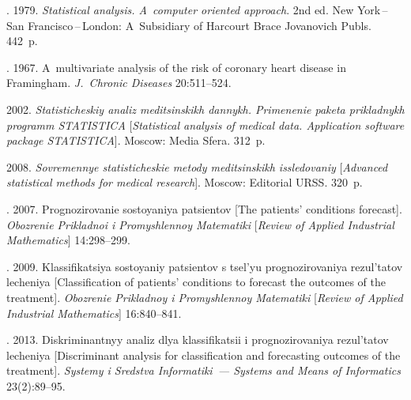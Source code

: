   \begin{multicols}{2}

\renewcommand{\bibname}{\protect\rmfamily References}

{\small\frenchspacing
{%
\begin{thebibliography}{9}


. 1979. 
\textit{Statistical analysis. A~computer oriented approach}.  2nd ed.
New York\,--\,San Francisco\,--\,London: A~Subsidiary of 
Harcourt Brace Jovanovich Publs. 442~p.

. 
1967. A~multivariate analysis of the risk of coronary heart disease in Framingham. 
\textit{J.~Chronic Diseases} 20:511--524.

 2002. 
\textit{Statisticheskiy analiz meditsinskikh dannykh. 
Primenenie paketa prikladnykh programm STATISTICA} 
[\textit{Statistical analysis of medical data. Application software package STATISTICA}]. 
Moscow: Media Sfera. 312~p.

 2008. 
\textit{Sovremennye statisticheskie metody meditsinskikh issledovaniy} 
[\textit{Advanced statistical methods for medical research}]. Moscow: Editorial URSS.
320~p.



. 
2007. Prognozirovanie sostoyaniya patsientov [The patients' conditions forecast]. 
\textit{Obozrenie Prikladnoi i Promyshlennoy Matematiki} 
[\textit{Review  of Applied  Industrial Mathematics}] 14:298--299.

\vspace*{2pt}

. 2009. 
Klassifi\-ka\-tsiya sostoyaniy patsientov s tsel'yu prognozirovaniya re\-zul'\-ta\-tov lecheniya 
[Classification of patients' conditions to forecast the outcomes of the treatment]. 
\textit{Obozrenie Prikladnoy i Promyshlennoy Matematiki} 
[\textit{Review of Applied  Industrial Mathematics}] 16:840--841.

\vspace*{2pt}

 
. 
2013. Diskri\-mi\-nantnyy analiz dlya klassifikatsii i prognozirovaniya rezul'tatov lecheniya 
[Discriminant analysis for classification and forecasting outcomes of the treatment]. 
\textit{Systemy i Sredstva Informatiki~---
Systems and Means of Informatics}
23(2):89--95.
\end{thebibliography}
} }

\end{multicols}

